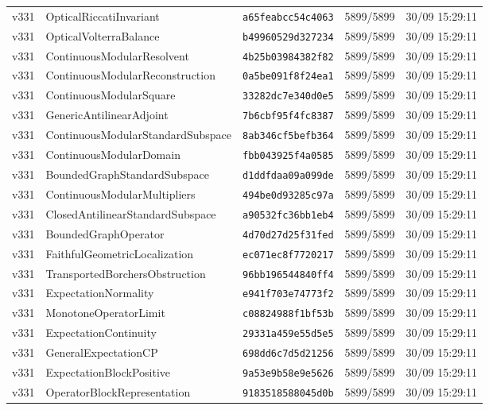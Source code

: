 \documentclass[11pt]{article}
\theoremstyle{definition}\newtheorem{deriv}{Derivation}
\begin{document}
{\begin{longtable}{@{}lllll@{}}
v331 & OpticalRiccatiInvariant & \texttt{a65feabcc54c4063} & 5899/5899 & 30/09 15:29:11 \\
v331 & OpticalVolterraBalance & \texttt{b49960529d327234} & 5899/5899 & 30/09 15:29:11 \\
v331 & ContinuousModularResolvent & \texttt{4b25b03984382f82} & 5899/5899 & 30/09 15:29:11 \\
v331 & ContinuousModularReconstruction & \texttt{0a5be091f8f24ea1} & 5899/5899 & 30/09 15:29:11 \\
v331 & ContinuousModularSquare & \texttt{33282dc7e340d0e5} & 5899/5899 & 30/09 15:29:11 \\
v331 & GenericAntilinearAdjoint & \texttt{7b6cbf95f4fc8387} & 5899/5899 & 30/09 15:29:11 \\
v331 & ContinuousModularStandardSubspace & \texttt{8ab346cf5befb364} & 5899/5899 & 30/09 15:29:11 \\
v331 & ContinuousModularDomain & \texttt{fbb043925f4a0585} & 5899/5899 & 30/09 15:29:11 \\
v331 & BoundedGraphStandardSubspace & \texttt{d1ddfdaa09a099de} & 5899/5899 & 30/09 15:29:11 \\
v331 & ContinuousModularMultipliers & \texttt{494be0d93285c97a} & 5899/5899 & 30/09 15:29:11 \\
v331 & ClosedAntilinearStandardSubspace & \texttt{a90532fc36bb1eb4} & 5899/5899 & 30/09 15:29:11 \\
v331 & BoundedGraphOperator & \texttt{4d70d27d25f31fed} & 5899/5899 & 30/09 15:29:11 \\
v331 & FaithfulGeometricLocalization & \texttt{ec071ec8f7720217} & 5899/5899 & 30/09 15:29:11 \\
v331 & TransportedBorchersObstruction & \texttt{96bb196544840ff4} & 5899/5899 & 30/09 15:29:11 \\
v331 & ExpectationNormality & \texttt{e941f703e74773f2} & 5899/5899 & 30/09 15:29:11 \\
v331 & MonotoneOperatorLimit & \texttt{c08824988f1bf53b} & 5899/5899 & 30/09 15:29:11 \\
v331 & ExpectationContinuity & \texttt{29331a459e55d5e5} & 5899/5899 & 30/09 15:29:11 \\
v331 & GeneralExpectationCP & \texttt{698dd6c7d5d21256} & 5899/5899 & 30/09 15:29:11 \\
v331 & ExpectationBlockPositive & \texttt{9a53e9b58e9e5626} & 5899/5899 & 30/09 15:29:11 \\
v331 & OperatorBlockRepresentation & \texttt{9183518588045d0b} & 5899/5899 & 30/09 15:29:11 \\

\end{longtable}}
\end{document}
